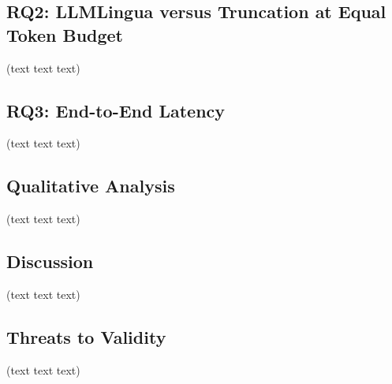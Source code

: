 \documentclass[10pt,a4paper,twocolumn]{article}
\begin{document}

\subsection{RQ2: LLMLingua versus Truncation at Equal Token Budget}
(text text text)


\subsection{RQ3: End-to-End Latency}
(text text text)


\subsection{Qualitative Analysis}
(text text text)


\subsection{Discussion}
(text text text)


\subsection{Threats to Validity}
(text text text)

\end{document}
